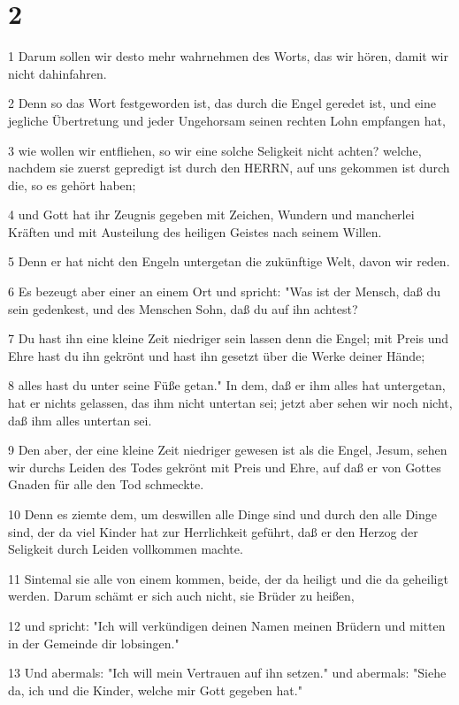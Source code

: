 \chapter{2}

\par 1 Darum sollen wir desto mehr wahrnehmen des Worts, das wir hören, damit wir nicht dahinfahren.
\par 2 Denn so das Wort festgeworden ist, das durch die Engel geredet ist, und eine jegliche Übertretung und jeder Ungehorsam seinen rechten Lohn empfangen hat,
\par 3 wie wollen wir entfliehen, so wir eine solche Seligkeit nicht achten? welche, nachdem sie zuerst gepredigt ist durch den HERRN, auf uns gekommen ist durch die, so es gehört haben;
\par 4 und Gott hat ihr Zeugnis gegeben mit Zeichen, Wundern und mancherlei Kräften und mit Austeilung des heiligen Geistes nach seinem Willen.
\par 5 Denn er hat nicht den Engeln untergetan die zukünftige Welt, davon wir reden.
\par 6 Es bezeugt aber einer an einem Ort und spricht: "Was ist der Mensch, daß du sein gedenkest, und des Menschen Sohn, daß du auf ihn achtest?
\par 7 Du hast ihn eine kleine Zeit niedriger sein lassen denn die Engel; mit Preis und Ehre hast du ihn gekrönt und hast ihn gesetzt über die Werke deiner Hände;
\par 8 alles hast du unter seine Füße getan." In dem, daß er ihm alles hat untergetan, hat er nichts gelassen, das ihm nicht untertan sei; jetzt aber sehen wir noch nicht, daß ihm alles untertan sei.
\par 9 Den aber, der eine kleine Zeit niedriger gewesen ist als die Engel, Jesum, sehen wir durchs Leiden des Todes gekrönt mit Preis und Ehre, auf daß er von Gottes Gnaden für alle den Tod schmeckte.
\par 10 Denn es ziemte dem, um deswillen alle Dinge sind und durch den alle Dinge sind, der da viel Kinder hat zur Herrlichkeit geführt, daß er den Herzog der Seligkeit durch Leiden vollkommen machte.
\par 11 Sintemal sie alle von einem kommen, beide, der da heiligt und die da geheiligt werden. Darum schämt er sich auch nicht, sie Brüder zu heißen,
\par 12 und spricht: "Ich will verkündigen deinen Namen meinen Brüdern und mitten in der Gemeinde dir lobsingen."
\par 13 Und abermals: "Ich will mein Vertrauen auf ihn setzen." und abermals: "Siehe da, ich und die Kinder, welche mir Gott gegeben hat."
